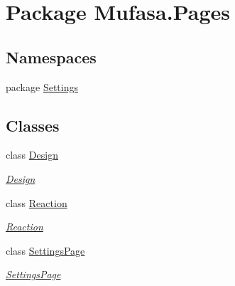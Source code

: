 \hypertarget{namespace_mufasa_1_1_pages}{\section{Package Mufasa.\+Pages}
\label{namespace_mufasa_1_1_pages}
}
\subsection*{Namespaces}
\begin{DoxyCompactItemize}
\item 
package \hyperlink{namespace_mufasa_1_1_pages_1_1_settings}{Settings}
\end{DoxyCompactItemize}
\subsection*{Classes}
\begin{DoxyCompactItemize}
\item 
class \hyperlink{class_mufasa_1_1_pages_1_1_design}{Design}
\begin{DoxyCompactList}\small\item\em \hyperlink{class_mufasa_1_1_pages_1_1_design}{Design} \end{DoxyCompactList}\item 
class \hyperlink{class_mufasa_1_1_pages_1_1_reaction}{Reaction}
\begin{DoxyCompactList}\small\item\em \hyperlink{class_mufasa_1_1_pages_1_1_reaction}{Reaction} \end{DoxyCompactList}\item 
class \hyperlink{class_mufasa_1_1_pages_1_1_settings_page}{Settings\+Page}
\begin{DoxyCompactList}\small\item\em \hyperlink{class_mufasa_1_1_pages_1_1_settings_page}{Settings\+Page} \end{DoxyCompactList}\end{DoxyCompactItemize}
